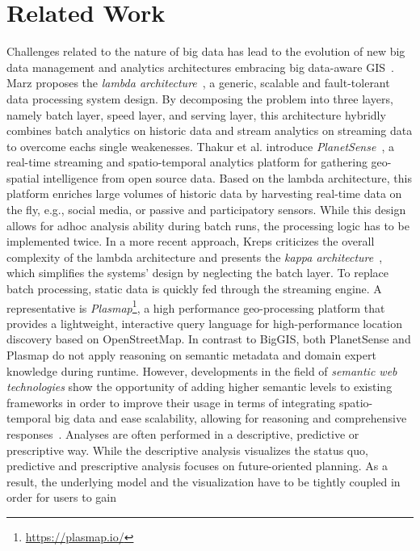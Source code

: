 \documentclass{sig-alternate-05-2015}
\begin{document}
\section{Related Work}
\label{sec:related}
Challenges related to the nature of big data has
lead to the evolution of new big data management and analytics architectures
embracing big data-aware GIS~\cite{Peng2014}. Marz proposes the
\textit{lambda architecture}~\cite{Marz2013}, a generic, scalable and
fault-tolerant data processing system design. By decomposing the problem into
three layers, namely batch layer, speed layer, and serving layer, this
architecture hybridly combines batch analytics on historic data and stream
analytics on streaming data to overcome eachs single weakenesses. Thakur et al.
introduce \textit{PlanetSense}~\cite{Thakur2015}, a real-time streaming and
spatio-temporal analytics platform for gathering geo-spatial intelligence from
open source data. Based on the lambda architecture, this platform enriches
large volumes of historic data by harvesting real-time data on the fly, e.g.,
social media, or passive and participatory sensors. While this design allows
for adhoc analysis ability during batch runs, the processing logic has to be
implemented twice. In a more recent approach, Kreps criticizes the
overall complexity of the lambda architecture and presents the \textit{kappa
architecture}~\cite{Kreps2014}, which simplifies the systems' design
by neglecting the batch layer. To replace batch processing, static data is
quickly fed through the streaming engine. A representative is
\textit{Plasmap}\footnote{\url{https://plasmap.io/}}, a high performance
geo-processing platform that provides a lightweight, interactive query language
for high-performance location discovery based on OpenStreetMap. In contrast to
BigGIS, both PlanetSense and Plasmap do not apply reasoning on semantic
metadata and domain expert knowledge during runtime. However, developments in
the field of \textit{semantic web technologies} show the opportunity of adding 
higher semantic  levels  to existing frameworks in order to improve their 
usage in terms of integrating spatio-temporal big data and ease scalability,
allowing for reasoning and comprehensive responses~\cite{Tanasescu2006,
Frank.2016a, Frank.2016b}. Analyses are often
performed in a descriptive, predictive or prescriptive way. While the
descriptive analysis visualizes the status quo, predictive and prescriptive
analysis focuses on future-oriented planning. As a result, the underlying model
and the visualization have to be tightly coupled in order for users to gain
\end{document}
